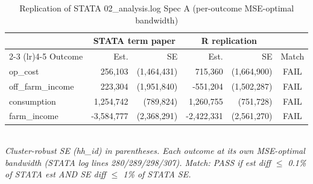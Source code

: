 \begin{table}[t]
\centering
\caption{Replication of STATA 02\_analysis.log Spec A (per-outcome MSE-optimal bandwidth)}
\label{tab:replication_specA}
\begin{tabular}{lrrrrc}
\toprule
 & \multicolumn{2}{c}{STATA term paper} & \multicolumn{2}{c}{R replication} & \\
\cmidrule(lr){2-3} \cmidrule(lr){4-5}
Outcome & Est. & SE & Est. & SE & Match \\
\midrule
op_cost & 256,103 & (1,464,431) & 715,360 & (1,664,900) & FAIL \\
off_farm_income & 223,304 & (1,951,840) & -551,204 & (1,502,287) & FAIL \\
consumption & 1,254,742 & (789,824) & 1,260,755 & (751,728) & FAIL \\
farm_income & -3,584,777 & (2,368,291) & -2,422,331 & (2,561,270) & FAIL \\
\bottomrule
\end{tabular}
\\
\footnotesize\textit{Cluster-robust SE (hh\_id) in parentheses. Each outcome at its own MSE-optimal bandwidth (STATA log lines 280/289/298/307). Match: PASS if est diff $\le$ 0.1\% of STATA est AND SE diff $\le$ 1\% of STATA SE.}
\end{table}

